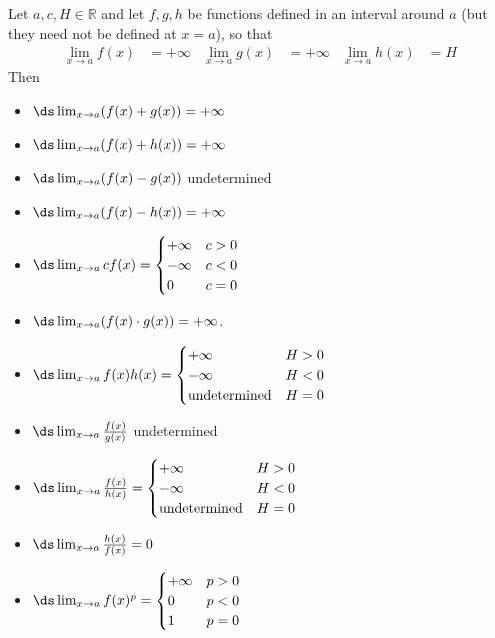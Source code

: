 \begin{theorem}
\label{thm arith inf lim}
Let $a,c,H \in \mathbb{R}$ and let $f,g,h$ be functions defined in
an interval around $a$ (but they need not be defined at $x=a$), so that
\begin{align*}
\lim_{x \to a} f(x) &= +\infty &
\lim_{x \to a} g(x) &= +\infty &
\lim_{x \to a} h(x) &= H
\end{align*}
Then
\begin{itemize}
\item $\ds \lim_{x \to a} ( f(x) + g(x) ) = +\infty$
\item $\ds \lim_{x \to a} ( f(x) + h(x) ) = +\infty$
\item $\ds \lim_{x \to a} ( f(x) - g(x) )$ undetermined
\item $\ds \lim_{x \to a} ( f(x) - h(x) ) = +\infty$
\item $\ds \lim_{x \to a} c f(x) =
\begin{cases}
+\infty & c>0 \\
-\infty & c<0 \\
0       & c=0
\end{cases}$
\item $\ds \lim_{x \to a} ( f(x) \cdot g(x) ) = +\infty$.
\item $\ds \lim_{x \to a} f(x) h(x) =
\begin{cases}
+\infty & H>0 \\
-\infty & H<0\\
\text{undetermined} & H=0
\end{cases}
$
\item $\ds \lim_{x \to a} \frac{f(x)}{g(x)}$ undetermined
\item $\ds \lim_{x \to a} \frac{f(x)}{h(x)} =
\begin{cases}
+\infty & H>0 \\
-\infty & H<0\\
\text{undetermined} & H=0
\end{cases}$
\item $\ds \lim_{x \to a} \frac{h(x)}{f(x)} = 0$
\item $\ds \lim_{x \to a} f(x)^p =
\begin{cases}
+\infty & p>0 \\
0 & p<0\\
1 & p=0
\end{cases}$
\end{itemize}
\end{theorem}

